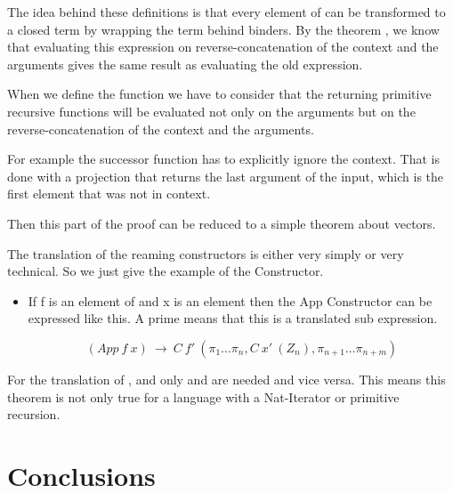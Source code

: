 \documentclass{jfp}
\begin{document}
\sTtoPRSignature

\sTtoPRSoundSig

The idea behind these definitions is that every element of  can be transformed to a closed term by wrapping the term behind  binders. By the theorem , we know that evaluating this  expression on reverse-concatenation of the context and the arguments gives the same result as evaluating the old expression.


When we define the function  we have to consider that the returning primitive recursive functions will be evaluated not only on the arguments but on the reverse-concatenation of the context and the arguments.

For example the successor function has to explicitly ignore the context.
\sTtoPRSuc
That is done with a projection that returns the last argument of the input, which is the first element that was not in context.
\sTtoPRSoundSuc

Then this part of the proof can be reduced to a simple theorem about vectors.
\lookupFromN

The translation of the reaming constructors is either very simply or very technical. So we just give the example of the  Constructor.
\begin{itemize}
	\item If f is an element of  and x is an element  then the App Constructor can be expressed like this. A prime means that this is a translated sub expression.
	
	$$ (App \ f \ x) \ \rightarrow \ C \ f' \ (\pi_{1}\dots\pi_{n}, C \ x' \ (Z_{n}),\pi_{n + 1}\dots\pi_{n + m}  ) $$ 
\end{itemize}

For the translation of ,  and  only  and  are needed and vice versa. This means this theorem is not only true for a language with a Nat-Iterator or primitive recursion. 



%




\section{Conclusions}
\label{sec:conclusions}




\label{lastpage01}
\end{document}
